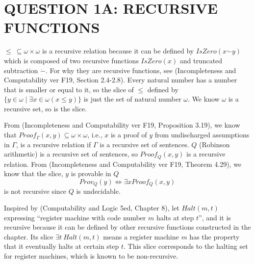 \section*{QUESTION 1A: RECURSIVE FUNCTIONS}

$\leq\ \subseteq \omega \times \omega$ is a recursive relation because it can be defined by $IsZero(x \dot - y)$ which is composed of two recursive functions $IsZero(x)$ and truncated subtraction $\dot -$. For why they are recursive functions, see (Incompleteness and Computability ver F19, Section 2.4-2.8). Every natural number has a number that is smaller or equal to it, so the slice of $\leq$ defined by $\{ y \in \omega \mid \exists x \in \omega (x \leq y) \}$ is just the set of natural number $\omega$. We know $\omega$ is a recursive set, so is the slice.

From (Incompleteness and Computability ver F19, Proposition 3.19), we know that $Proof_\Gamma(x,y) \subseteq \omega \times \omega$, i.e., $x$ is a proof of $y$ from undischarged assumptions in $\Gamma$, is a recursive relation if $\Gamma$ is a recursive set of sentences. $Q$ (Robinson arithmetic) is a recursive set of sentences, so $Proof_Q(x,y)$ is a recursive relation. From (Incompleteness and Computability ver F19, Theorem 4.29), we know that the slice, $y$ is provable in $Q$
\begin{equation*}
  Prov_Q(y) \iff \exists x Proof_Q(x,y)    
\end{equation*}
is not recursive since $Q$ is undecidable.

Inspired by (Computability and Logic 5ed, Chapter 8), let $Halt(m, t)$ expressing ``register machine with code number $m$ halts at step $t$'', and it is recursive because it can be defined by other recursive functions constructed in the chapter. Its slice $\exists t\ Halt(m, t)$ means a register machine $m$ has the property that it eventually halts at certain step $t$. This slice corresponds to the halting set for register machines, which is known to be non-recursive.
